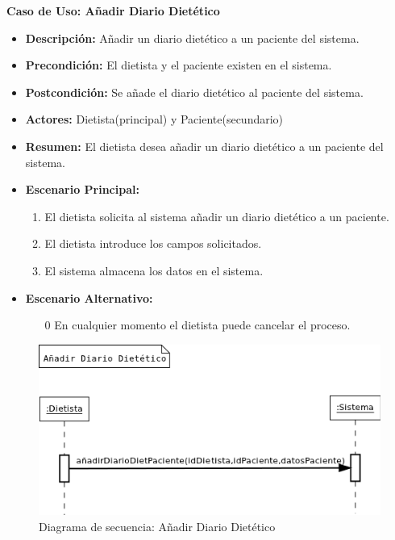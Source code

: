 \textbf{Caso de Uso: Añadir Diario Dietético}
\begin{itemize}
\item \textbf{Descripción:} Añadir un diario dietético a un paciente del sistema.
\item \textbf{Precondición:} El dietista y el paciente existen en el sistema.
\item \textbf{Postcondición:} Se añade el diario dietético al paciente del sistema.
\item \textbf{Actores:} Dietista(principal) y Paciente(secundario)
\item \textbf{Resumen:} El dietista desea añadir un diario dietético a un paciente del sistema.
\item \textbf{Escenario Principal:}
\begin{enumerate}
\item El dietista solicita al sistema añadir un diario dietético a un paciente.
\item El dietista introduce los campos solicitados.
\item El sistema almacena los datos en el sistema.
\end{enumerate}
\item \textbf{Escenario Alternativo:}
\begin{enumerate}
\item[0] En cualquier momento el dietista puede cancelar el proceso.
\end{enumerate}
\end{itemize}
\begin{figure}[H]
  \label{ds_anadirdiariodiet}
  \begin{center}
    \includegraphics[scale=0.7]{../img/DS_AnadirDiarioDiet.png}
  \end{center}
  \caption{Diagrama de secuencia: Añadir Diario Dietético}
\end{figure}
